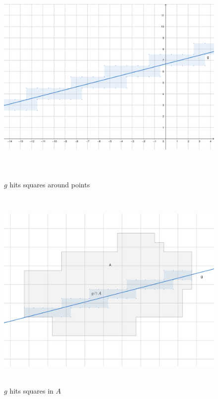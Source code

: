 \documentclass[12pt,a4paper]{scrartcl}
\numberwithin{equation}{subsection}
\newcommand{\1}{\mathbbm{1}}
\numberwithin{equation}{section}
\theoremstyle{definition}
\begin{document}
\begin{figure}
	\centering
	\includegraphics[height=10cm]{images/geogebra-images/line-hit-squares.png}
	\caption{$g$ hits squares around points} \label{linesquares}
	\includegraphics[height=10cm]{images/geogebra-images/line-hit-A.png}
	\caption{$g$ hits squares in $A$} \label{linesquaresA}
\end{figure}
\end{document}
